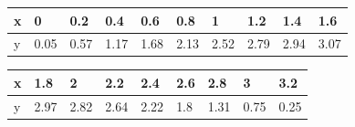 \documentclass[12pt]{article}
\begin{document}
\begin{enumerate}
{        \begin{tabular}{|p{1cm}|p{1cm}|p{1cm}|p{1cm}|p{1cm}|p{1cm}|p{1cm}|p{1cm}|p{1cm}|p{1cm}|}
            \hline
            x & 0    & 0.2  & 0.4  & 0.6  & 0.8  & 1    & 1.2  & 1.4  & 1.6  \\ \hline
            y & 0.05 & 0.57 & 1.17 & 1.68 & 2.13 & 2.52 & 2.79 & 2.94 & 3.07 \\ \hline
        \end{tabular}
        \begin{tabular}{|p{1cm}|p{1cm}|p{1cm}|p{1cm}|p{1cm}|p{1cm}|p{1cm}|p{1cm}|p{1cm}|}
            \hline
            x & 1.8  & 2    & 2.2  & 2.4  & 2.6 & 2.8  & 3    & 3.2  \\ \hline
            y & 2.97 & 2.82 & 2.64 & 2.22 & 1.8 & 1.31 & 0.75 & 0.25 \\ \hline
        \end{tabular}

}
\end{enumerate}
\end{document}
